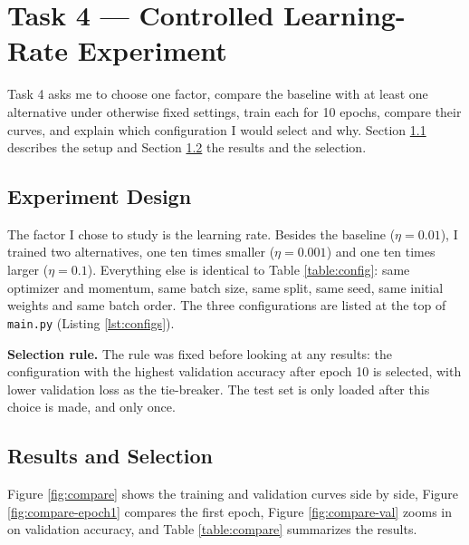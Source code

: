 \chapter{Task 4 --- Controlled Learning-Rate Experiment}
\label{ch:task4}


Task 4 asks me to choose one factor, compare the baseline with at least
one alternative under otherwise fixed settings, train each for 10
epochs, compare their curves, and explain which configuration I would
select and why. Section \ref{sec:experiment-design} describes the
setup and Section \ref{sec:task4} the results and the selection.

\section{Experiment Design}
\label{sec:experiment-design}

The factor I chose to study is the learning rate. Besides the baseline
($\eta = 0.01$), I trained two alternatives, one ten times smaller
($\eta = 0.001$) and one ten times larger ($\eta = 0.1$). Everything else
is identical to Table \ref{table:config}: same optimizer and momentum,
same batch size, same split, same seed, same initial weights and same
batch order. The three configurations are listed at the top of
\texttt{main.py} (Listing \ref{lst:configs}).



\textbf{Selection rule.} The rule was fixed before looking at any
results: the configuration with the highest validation accuracy after
epoch 10 is selected, with lower validation loss as the tie-breaker. The
test set is only loaded after this choice is made, and only once.


\section{Results and Selection}
\label{sec:task4}

Figure \ref{fig:compare} shows the
training and validation curves side by side, Figure
\ref{fig:compare-epoch1} compares the first epoch, Figure
\ref{fig:compare-val} zooms in on validation accuracy, and Table
\ref{table:compare} summarizes the results.

